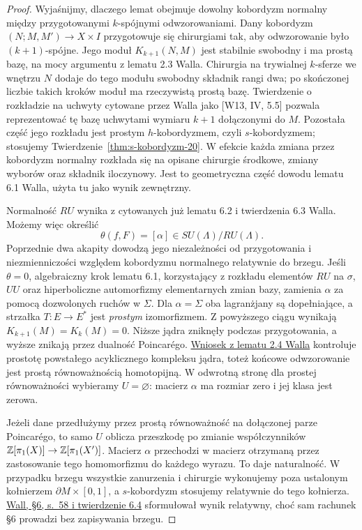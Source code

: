 \begin{proof}
Wyjaśnijmy, dlaczego lemat obejmuje dowolny
kobordyzm normalny między przygotowanymi
$k$-spójnymi odwzorowaniami. Dany kobordyzm
$(N;M,M')\to X\times I$ przygotowuje się
chirurgiami tak, aby odwzorowanie było
$(k+1)$-spójne. Jego moduł
$K_{k+1}(N,M)$ jest stabilnie swobodny i ma
prostą bazę, na mocy argumentu z lematu 2.3
Walla. Chirurgia na trywialnej $k$-sferze
we wnętrzu $N$ dodaje do tego modułu swobodny
składnik rangi dwa; po skończonej liczbie takich
kroków moduł ma rzeczywistą prostą bazę.
Twierdzenie o rozkładzie na uchwyty cytowane
przez Walla jako [W13, IV, 5.5] pozwala
reprezentować tę bazę uchwytami wymiaru
$k+1$ dołączonymi do $M$. Pozostała część
jego rozkładu jest prostym $h$-kobordyzmem,
czyli $s$-kobordyzmem; stosujemy
Twierdzenie~\ref{thm:s-kobordyzm-20}.
W efekcie każda zmiana przez kobordyzm
normalny rozkłada się na opisane chirurgie
środkowe, zmiany wyborów oraz składnik
iloczynowy. Jest to geometryczna część
dowodu lematu 6.1 Walla, użyta tu jako
wynik zewnętrzny.

Normalność $RU$ wynika z cytowanych już
lematu 6.2 i twierdzenia 6.3 Walla. Możemy
więc określić
\[
 \theta(f,F)=[\alpha]\in SU(\Lambda)/RU(\Lambda).
\]
Poprzednie dwa akapity dowodzą jego
niezależności od przygotowania i niezmienniczości
względem kobordyzmu normalnego relatywnie do
brzegu. Jeśli $\theta=0$, algebraiczny krok
lematu 6.1, korzystający z rozkładu elementów
$RU$ na $\sigma$, $UU$ oraz hiperboliczne
automorfizmy elementarnych zmian bazy,
zamienia $\alpha$ za pomocą dozwolonych
ruchów w $\Sigma$. Dla $\alpha=\Sigma$ oba
lagranżjany są dopełniające, a strzałka
$T:E\to E^*$ jest \emph{prostym} izomorfizmem.
Z powyższego ciągu wynikają
$K_{k+1}(M)=K_k(M)=0$. Niższe jądra
zniknęły podczas przygotowania, a wyższe
znikają przez dualność Poincarégo.
\href{https://www.maths.ed.ac.uk/~v1ranick/books/scm.pdf}
{Wniosek z lematu 2.4 Walla} kontroluje
prostotę powstałego acyklicznego kompleksu
jądra, toteż końcowe odwzorowanie jest
prostą równoważnością homotopijną.
W odwrotną stronę dla prostej równoważności
wybieramy $U=\varnothing$: macierz $\alpha$
ma rozmiar zero i jej klasa jest zerowa.

Jeżeli dane przedłużymy przez prostą
równoważność na dołączonej parze Poincarégo,
to samo $U$ oblicza przeszkodę po zmianie
współczynników
$\mathbb{Z}[\pi_1(X)]\to\mathbb{Z}[\pi_1(X')]$.
Macierz $\alpha$ przechodzi w macierz otrzymaną
przez zastosowanie tego homomorfizmu do
każdego wyrazu. To daje naturalność.
W przypadku brzegu wszystkie zanurzenia i
chirurgie wykonujemy poza ustalonym kołnierzem
$\partial M\times[0,1]$, a $s$-kobordyzm
stosujemy relatywnie do tego kołnierza.
\href{https://www.maths.ed.ac.uk/~v1ranick/books/scm.pdf}
{Wall, §6, s.~58 i twierdzenie 6.4}
sformułował wynik relatywny, choć sam rachunek
§6 prowadzi bez zapisywania brzegu.
\end{proof}

